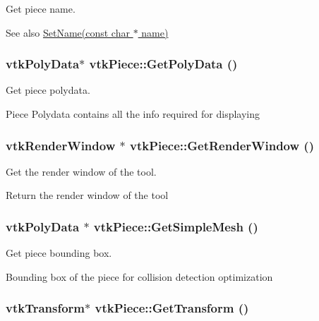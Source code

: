 Get piece name. 

\begin{DoxySeeAlso}{See also}
\hyperlink{classvtkPiece_ad7a95670a66a62e24e7685a6b8f6dafe}{SetName(const char $\ast$ name)} 
\end{DoxySeeAlso}
\hypertarget{classvtkPiece_a991a9f7eb675432b0a42da9094fbaed0}{
\subsubsection[{GetPolyData}]{\setlength{\rightskip}{0pt plus 5cm}vtkPolyData$\ast$ vtkPiece::GetPolyData ()}}
\label{classvtkPiece_a991a9f7eb675432b0a42da9094fbaed0}


Get piece polydata. 

Piece Polydata contains all the info required for displaying \hypertarget{classvtkPiece_a996426a2608412e8180fe12bff9ae5d7}{
\subsubsection[{GetRenderWindow}]{\setlength{\rightskip}{0pt plus 5cm}vtkRenderWindow $\ast$ vtkPiece::GetRenderWindow ()}}
\label{classvtkPiece_a996426a2608412e8180fe12bff9ae5d7}


Get the render window of the tool. 

Return the render window of the tool \hypertarget{classvtkPiece_a44bb3b9c2be3bac663b22c31f98daa09}{
\subsubsection[{GetSimpleMesh}]{\setlength{\rightskip}{0pt plus 5cm}vtkPolyData $\ast$ vtkPiece::GetSimpleMesh ()}}
\label{classvtkPiece_a44bb3b9c2be3bac663b22c31f98daa09}


Get piece bounding box. 

Bounding box of the piece for collision detection optimization \hypertarget{classvtkPiece_a5f0889b30ed3245f0e0797a94709c583}{
\subsubsection[{GetTransform}]{\setlength{\rightskip}{0pt plus 5cm}vtkTransform$\ast$ vtkPiece::GetTransform ()}}
\label{classvtkPiece_a5f0889b30ed3245f0e0797a94709c583}


